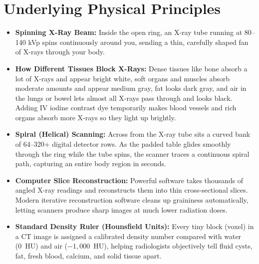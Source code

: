 \section{Underlying Physical Principles}
\begin{itemize}
    \item \textbf{Spinning X-Ray Beam:} Inside the open ring, an X-ray tube running at 80--140 kVp spins continuously around you, sending a thin, carefully shaped fan of X-rays through your body.
    \item \textbf{How Different Tissues Block X-Rays:} Dense tissues like bone absorb a lot of X-rays and appear bright white, soft organs and muscles absorb moderate amounts and appear medium gray, fat looks dark gray, and air in the lungs or bowel lets almost all X-rays pass through and looks black. Adding IV iodine contrast dye temporarily makes blood vessels and rich organs absorb more X-rays so they light up brightly.
    \item \textbf{Spiral (Helical) Scanning:} Across from the X-ray tube sits a curved bank of 64--320+ digital detector rows. As the padded table glides smoothly through the ring while the tube spins, the scanner traces a continuous spiral path, capturing an entire body region in seconds.
    \item \textbf{Computer Slice Reconstruction:} Powerful software takes thousands of angled X-ray readings and reconstructs them into thin cross-sectional slices. Modern iterative reconstruction software cleans up graininess automatically, letting scanners produce sharp images at much lower radiation doses.
    \item \textbf{Standard Density Ruler (Hounsfield Units):} Every tiny block (voxel) in a CT image is assigned a calibrated density number compared with water (0~HU) and air ($-1,000$~HU), helping radiologists objectively tell fluid cysts, fat, fresh blood, calcium, and solid tissue apart.
\end{itemize}

